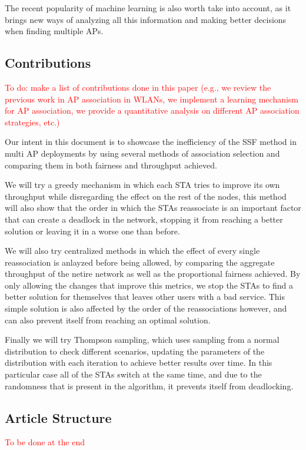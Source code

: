 \documentclass{ article}
\begin{document}
	The recent popularity of machine learning is also worth take into account, as it brings new ways of analyzing all this information and making better decisions when finding multiple APs.
	
	
	
	\subsection{Contributions}
	\label{section:contributions}
		\textcolor{red}{To do: make a list of contributions done in this paper (e.g., we review the previous work in AP association in WLANs, we implement a learning mechanism for AP association, we provide a quantitative analysis on different AP association strategies, etc.)}
		
		Our intent in this document is to showcase the inefficiency of the SSF method in multi AP deployments by using several methods of association selection and comparing them in both fairness and throughput achieved.
		
		We will try a greedy mechanism in which each STA tries to improve its own throughput while disregarding the effect on the rest of the nodes, this method will also show that the order in which the STAs reassociate is an important factor that can create a deadlock in the network, stopping it from reaching a better solution or leaving it in a worse one than before.
		
		We will also try centralized methods in which the effect of every single reassociation is anlayzed before being allowed, by comparing the aggregate throughput of the netire network as well as the proportional fairness achieved. By only allowing the changes that improve this metrics, we stop the STAs to find a better solution for themselves that leaves other users with a bad service. This simple solution is also affected by the order of the reassociations however, and can also prevent itself from reaching an optimal solution.
		
		Finally we will try Thompson sampling, which uses sampling from a normal distribution to check different scenarios, updating the parameters of the distribution with each iteration to achieve better results over time. In this particular case all of the STAs switch at the same time, and due to the randomness that is present in the algorithm, it prevents itself from deadlocking.
		
		
	\subsection{Article Structure}
	\label{section:article_structure}
			\textcolor{red}{To be done at the end}
			
\end{document}
